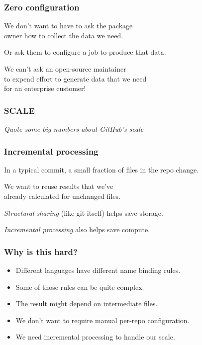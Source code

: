 \documentclass[aspectratio=169]{beamer}
\begin{document}
\begin{frame}
    \frametitle{Zero configuration}
    \begin{center}
        We don't want to have to ask the package \\ owner how to collect the data
        we need.
    \end{center}
    \begin{center}
        Or ask them to configure a job to produce that data.
    \end{center}
    \begin{center}
        We  can't ask an open-source maintainer \\ to expend
        effort to generate data that we need \\ for an enterprise customer!
    \end{center}
\end{frame}


\begin{frame}
    \frametitle{SCALE}
    \emph{Quote some big numbers about GitHub's scale}
\end{frame}


\begin{frame}
    \frametitle{Incremental processing}
    \begin{center}
        In a typical commit, a small fraction of files in the repo change.
    \end{center}
    \begin{center}
        We want to reuse results that we've \\ already calculated for unchanged
        files.
    \end{center}
    \begin{center}
        \emph{Structural sharing} (like git itself) helps save storage.
    \end{center}
    \begin{center}
        \emph{Incremental processing} also helps save compute.
    \end{center}
\end{frame}


\begin{frame}
    \frametitle{Why is this hard?}
    \begin{itemize}
        \item Different languages have different name binding rules.
        \item Some of those rules can be quite complex.
        \item The result might depend on intermediate files.
        \item We don't want to require manual per-repo configuration.
        \item We need incremental processing to handle our scale.
    \end{itemize}
\end{frame}
\end{document}
